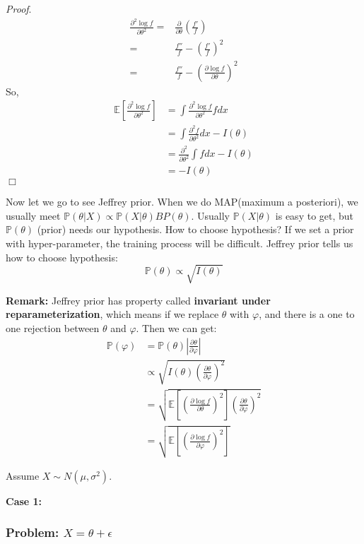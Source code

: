 \documentclass[11pt]{article}
\def\BP{{\bf P}}
\def\BP{{\mathbb P}}
\def\BE{{\mathbb E}}
\begin{document}
\textit{Proof}.
  \begin{equation*}
    \begin{split}
      \frac{\partial^2 \log f}{\partial \theta^2} = & \frac{\partial}{\partial \theta} \left( \frac{f'}{f}\right) \\
       = & \frac{f''}{f} - \left(\frac{f'}{f}\right)^2 \\
       = & \frac{f''}{f} - \left(\frac{\partial \log f}{\partial \theta}\right)^2 
    \end{split}
  \end{equation*}
  So, \[\begin{split}
  \BE[\frac{\partial^2 \log f}{\partial \theta^2}] & = \int \frac{\partial^2 \log f}{\partial \theta^2} f dx \\
  & = \int \frac{\partial^2 f}{\partial \theta^2} dx - I(\theta) \\
  & = \frac{\partial^2}{\partial \theta^2} \int f dx - I(\theta)  \\
  & = - I(\theta)
  \end{split}\]
\hfill$\Box$
  
Now let we go to see Jeffrey prior. When we do MAP(maximum a posteriori), we usually meet $\BP(\theta | X) \propto \BP(X | \theta) BP(\theta)$. 
Usually $\BP(X | \theta)$ is easy to get, but $\BP(\theta)$ (prior) needs our hypothesis. How to choose hypothesis? If we set a prior with hyper-parameter, the training process will be difficult. Jeffrey prior tells us how to choose hypothesis:
\[ \BP(\theta) \propto \sqrt{I(\theta)}\]

\textbf{Remark:} Jeffrey prior has property called \textbf{ invariant under reparameterization}, which means if we replace $\theta$ with $\varphi$, and there is a one to one rejection between $\theta$ and $\varphi$. Then we can get:
\[\begin{split} \BP(\varphi) & = \BP(\theta) \left| \frac{\partial \theta}{\partial \varphi} \right| \\
& \propto \sqrt{ I (\theta) \left(\frac{\partial \theta}{\partial \varphi}\right)^2} \\
& = \sqrt{\BE\left[ \left(\frac{\partial \log f}{\partial \theta}\right)^2\right]\left(\frac{\partial \theta}{\partial \varphi}\right)^2} \\
& = \sqrt{\BE\left[ \left( \frac{\partial \log f}{\partial \varphi} \right)^2 \right]}
\end{split}\]

Assume $X \sim N(\mu, \sigma^2)$.

\textbf{Case 1:}
\subsubsection{Problem: $X = \theta + \epsilon$}
\end{document}
